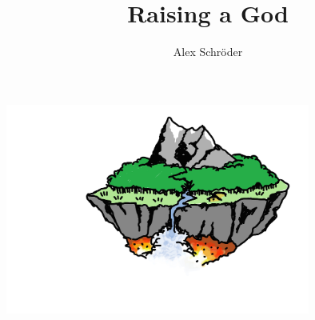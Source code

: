 \documentclass[11pt]{bxart}
\title{\textbf{Raising a God}}
\author{Alex Schröder}
\begin{document}
\begin{titlepage}
  \maketitle
  \centering
  \includegraphics[width=10cm]{Floating-Island.jpg}
  \tableofcontents
\end{titlepage} 

\end{document}
